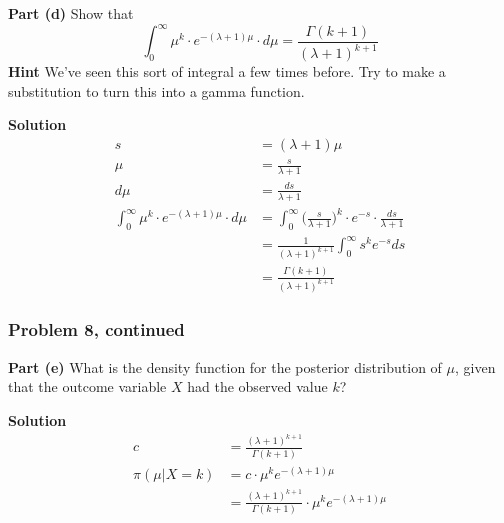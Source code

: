 \documentclass[12pt]{article}
\theoremstyle{definition}
\begin{document}
\noindent
{\bf Part (d)} Show that
$$
\int_0^\infty \mu^{k} \cdot e^{-(\lambda+1) \mu} \cdot d\mu = \frac{ \Gamma( k + 1 ) }{(\lambda + 1)^{k+1} }
$$
\noindent
{\bf Hint} We've seen this sort of integral a few times before. Try to make a substitution to turn this into a gamma function.

\bigskip
\noindent
{\bf Solution}
\begin{align*}
s &= (\lambda + 1)\mu\\
\mu &= \frac{s}{\lambda + 1}\\
d\mu &= \frac{ds}{\lambda + 1}\\
\int_0^\infty \mu^{k} \cdot e^{-(\lambda+1) \mu} \cdot d\mu &= \int_0^\infty \biggr(\frac{s}{\lambda + 1}\biggr)^{k} \cdot e^{-s} \cdot \frac{ds}{\lambda + 1}\\
&= \frac{1}{(\lambda + 1)^{k + 1}} \int_0^\infty s^k e^{-s}ds\\
&= \frac{\Gamma(k + 1)}{(\lambda + 1)^{k + 1}}
\end{align*}



\newpage
\subsubsection*{Problem 8, continued}

\noindent
{\bf Part (e)} What is the density function for the posterior distribution of $\mu$, given that the outcome variable $X$ had the observed value $k$?

\bigskip
\noindent
{\bf Solution}
\begin{align*}
c &= \frac{(\lambda + 1)^{k + 1}}{\Gamma(k+1)}\\
\pi(\mu|X=k) &= c \cdot \mu^k e^{-(\lambda + 1)\mu}\\
&= \frac{(\lambda + 1)^{k + 1}}{\Gamma(k+1)} \cdot \mu^k e^{-(\lambda + 1)\mu}\\
\end{align*}
\end{document}
